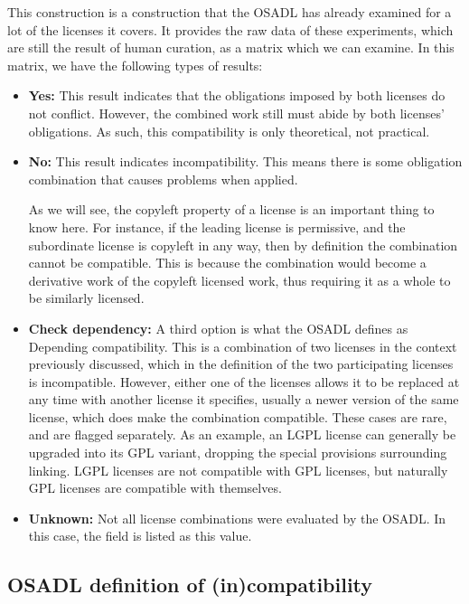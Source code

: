 This construction is a construction that the OSADL has already examined for a lot of the licenses it covers. It provides the raw data of these experiments, which are still the result of human curation, as a matrix which we can examine. In this matrix, we have the following types of results:

\begin{itemize}
	\item \textbf{Yes:} This result indicates that the obligations imposed by both licenses do not conflict. However, the combined work still must abide by both licenses' obligations. As such, this compatibility is only theoretical, not practical.
	\item \textbf{No:} This result indicates incompatibility. This means there is some obligation combination that causes problems when applied.
	
	As we will see, the copyleft property of a license is an important thing to know here. For instance, if the leading license is permissive, and the subordinate license is copyleft in any way, then by definition the combination cannot be compatible. This is because the combination would become a derivative work of the copyleft licensed work, thus requiring it as a whole to be similarly licensed.
	\item \textbf{Check dependency:} A third option is what the OSADL defines as Depending compatibility. This is a combination of two licenses in the context previously discussed, which in the definition of the two participating licenses is incompatible. However, either one of the licenses allows it to be replaced at any time with another license it specifies, usually a newer version of the same license, which does make the combination compatible. These cases are rare, and are flagged separately. As an example, an LGPL license can generally be upgraded into its GPL variant, dropping the special provisions surrounding linking. LGPL licenses are not compatible with GPL licenses, but naturally GPL licenses are compatible with themselves.
	
	\item \textbf{Unknown:} Not all license combinations were evaluated by the OSADL. In this case, the field is listed as this value.
\end{itemize}

\subsection{OSADL definition of (in)compatibility}

